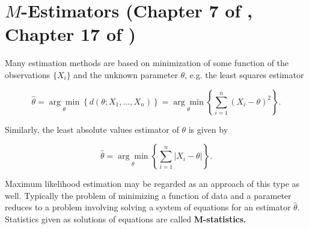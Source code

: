 \section{\(M\)-Estimators (Chapter 7 of \citet{serfling1980}, Chapter 17 of \citet{dasgupta2008asymptotic})}

Many estimation methods are based on minimization of some function of the observations \(\{X_i\}\) and the unknown parameter \(\theta\), e.g. the least squares estimator

\[
 \hat{\theta} = \underset{\theta}{\arg \min} \left\{ d(\theta; X_1, \ldots, X_n) \right\} = \underset{\theta}{\arg \min} \left\{  \sum_{i=1}^n (X_i - \theta)^2 \right\}.
\]

Similarly, the least absolute values estimator of \(\theta\) is given by

\[
 \hat{\theta} = \underset{\theta}{\arg \min} \left\{  \sum_{i=1}^n |X_i - \theta| \right\}.
\]

Maximum likelihood estimation may be regarded as an approach of this type as well. Typically the problem of minimizing a function of data and a parameter reduces to a problem involving solving a system of equations for an estimator \(\hat{\theta}\). Statistics given as solutions of equations are called \textbf{M-statistics.} 



%
%
%







